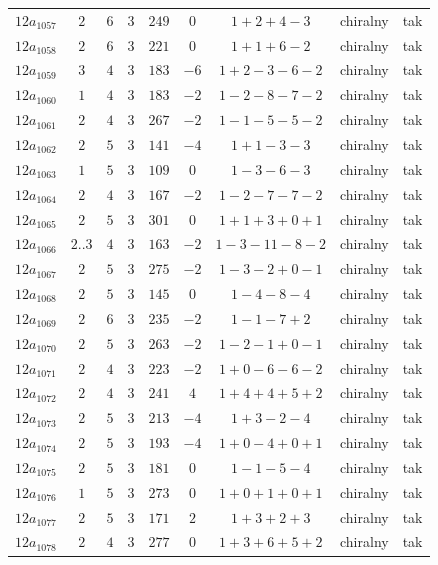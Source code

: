 \begin{longtable}{ccccccccc}
$12a_{1057}$ & $2$ & $6$ & $3$ & $249$ & $0$ & $1+2+4-3$ & chiralny & tak \\
$12a_{1058}$ & $2$ & $6$ & $3$ & $221$ & $0$ & $1+1+6-2$ & chiralny & tak \\
$12a_{1059}$ & $3$ & $4$ & $3$ & $183$ & $-6$ & $1+2-3-6-2$ & chiralny & tak \\
$12a_{1060}$ & $1$ & $4$ & $3$ & $183$ & $-2$ & $1-2-8-7-2$ & chiralny & tak \\
$12a_{1061}$ & $2$ & $4$ & $3$ & $267$ & $-2$ & $1-1-5-5-2$ & chiralny & tak \\
$12a_{1062}$ & $2$ & $5$ & $3$ & $141$ & $-4$ & $1+1-3-3$ & chiralny & tak \\
$12a_{1063}$ & $1$ & $5$ & $3$ & $109$ & $0$ & $1-3-6-3$ & chiralny & tak \\
$12a_{1064}$ & $2$ & $4$ & $3$ & $167$ & $-2$ & $1-2-7-7-2$ & chiralny & tak \\
$12a_{1065}$ & $2$ & $5$ & $3$ & $301$ & $0$ & $1+1+3+0+1$ & chiralny & tak \\
$12a_{1066}$ & $2..3$ & $4$ & $3$ & $163$ & $-2$ & $1-3-11-8-2$ & chiralny & tak \\
$12a_{1067}$ & $2$ & $5$ & $3$ & $275$ & $-2$ & $1-3-2+0-1$ & chiralny & tak \\
$12a_{1068}$ & $2$ & $5$ & $3$ & $145$ & $0$ & $1-4-8-4$ & chiralny & tak \\
$12a_{1069}$ & $2$ & $6$ & $3$ & $235$ & $-2$ & $1-1-7+2$ & chiralny & tak \\
$12a_{1070}$ & $2$ & $5$ & $3$ & $263$ & $-2$ & $1-2-1+0-1$ & chiralny & tak \\
$12a_{1071}$ & $2$ & $4$ & $3$ & $223$ & $-2$ & $1+0-6-6-2$ & chiralny & tak \\
$12a_{1072}$ & $2$ & $4$ & $3$ & $241$ & $4$ & $1+4+4+5+2$ & chiralny & tak \\
$12a_{1073}$ & $2$ & $5$ & $3$ & $213$ & $-4$ & $1+3-2-4$ & chiralny & tak \\
$12a_{1074}$ & $2$ & $5$ & $3$ & $193$ & $-4$ & $1+0-4+0+1$ & chiralny & tak \\
$12a_{1075}$ & $2$ & $5$ & $3$ & $181$ & $0$ & $1-1-5-4$ & chiralny & tak \\
$12a_{1076}$ & $1$ & $5$ & $3$ & $273$ & $0$ & $1+0+1+0+1$ & chiralny & tak \\
$12a_{1077}$ & $2$ & $5$ & $3$ & $171$ & $2$ & $1+3+2+3$ & chiralny & tak \\
$12a_{1078}$ & $2$ & $4$ & $3$ & $277$ & $0$ & $1+3+6+5+2$ & chiralny & tak \\

\end{longtable}
